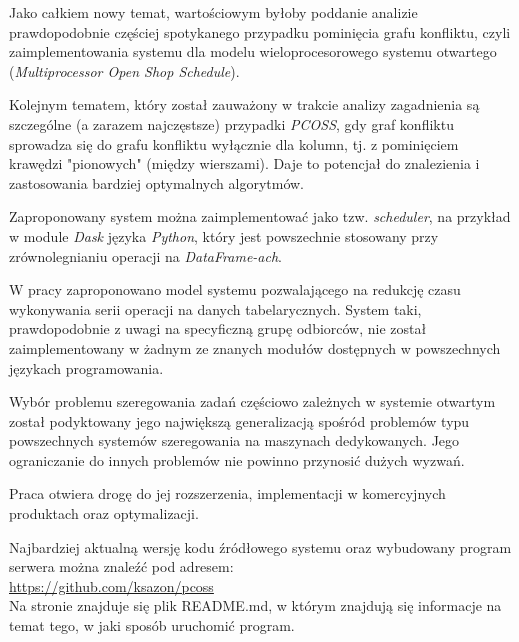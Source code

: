 \documentclass[brudnopis]{xmgr}
\begin{document}
Jako całkiem nowy temat, wartościowym byłoby poddanie analizie prawdopodobnie częściej spotykanego przypadku pominięcia grafu konfliktu, czyli zaimplementowania systemu dla modelu wieloprocesorowego systemu otwartego (\emph{Multiprocessor Open Shop Schedule}).
\medskip

Kolejnym tematem, który został zauważony w trakcie analizy zagadnienia są szczególne (a zarazem najczęstsze) przypadki \emph{PCOSS}, gdy graf konfliktu sprowadza się do grafu konfliktu wyłącznie dla kolumn, tj. z pominięciem krawędzi "pionowych" (między wierszami). Daje to potencjał do znalezienia i zastosowania bardziej optymalnych algorytmów.
\medskip

Zaproponowany system można zaimplementować jako tzw. \emph{scheduler}, na przykład w module \emph{Dask} \cite{dask} języka \emph{Python}, który jest powszechnie stosowany przy zrównolegnianiu operacji na \emph{DataFrame-ach}.



\summary

W pracy zaproponowano model systemu pozwalającego na redukcję czasu wykonywania serii operacji na danych tabelarycznych. System taki, prawdopodobnie z uwagi na specyficzną grupę odbiorców, nie został zaimplementowany w żadnym ze znanych modułów dostępnych w powszechnych językach programowania.
\medskip

Wybór problemu szeregowania zadań częściowo zależnych w systemie otwartym został podyktowany jego największą generalizacją spośród problemów typu powszechnych systemów szeregowania na maszynach dedykowanych. Jego ograniczanie do innych problemów nie powinno przynosić dużych wyzwań.
\medskip

Praca otwiera drogę do jej rozszerzenia, implementacji w komercyjnych produktach oraz optymalizacji.
\medskip

Najbardziej aktualną wersję kodu źródłowego systemu oraz wybudowany program serwera można znaleźć pod adresem:\\ \url{https://github.com/ksazon/pcoss}\\
Na stronie znajduje się plik README.md, w którym znajdują się informacje na temat tego, w jaki sposób uruchomić program.





% 
% 


% 
\printbibliography[nottype=online,title={Bibliografia}]
\printbibliography[type=online,title={Źródła internetowe}]
\listoftables

\listoffigures

\oswiadczenie
\end{document}
